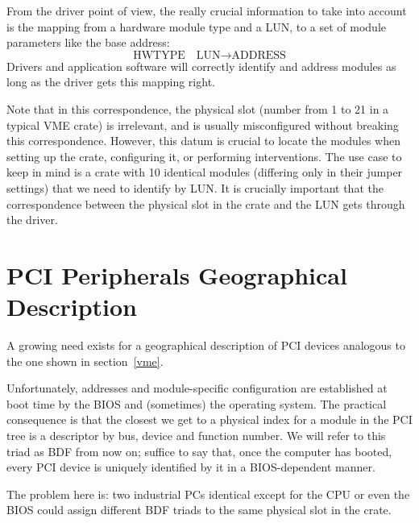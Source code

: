 \documentclass[a4paper]{article}
\begin{document}
From the driver point of view, the really crucial information to take
into account is the mapping from a hardware module type and a LUN, to a
set of module parameters like the base address:
\begin{equation*}
\text{HWTYPE}\quad\text{LUN} \to \text{ADDRESS}
\end{equation*}
Drivers and application software will correctly identify and address
modules as long as the driver gets this mapping right.

Note that in this correspondence, the physical slot (number from 1 to
21 in a typical VME crate) is irrelevant, and is usually misconfigured
without breaking this correspondence. However, this datum is crucial to
locate the modules when setting up the crate, configuring it, or
performing interventions. The use case to keep in mind is a crate with
10 identical modules (differing only in their jumper settings) that we
need to identify by LUN. It is crucially important that the
correspondence between the physical slot in the crate and the LUN gets
through the driver.

\section{PCI Peripherals Geographical Description}
\label{pci}

A growing need exists for a geographical description of PCI devices
analogous to the one shown in section~\ref{vme}.

Unfortunately, addresses and module-specific configuration are
established at boot time by the BIOS and (sometimes) the operating
system. The practical consequence is that the closest we get to a
physical index for a module in the PCI tree is a descriptor by bus,
device and function number. We will refer to this triad as BDF from now
on; suffice to say that, once the computer has booted, every PCI device
is uniquely identified by it in a BIOS-dependent manner.

The problem here is: two industrial PCs identical except for the CPU or
even the BIOS could assign different BDF triads to the same physical
slot in the crate.
\end{document}
